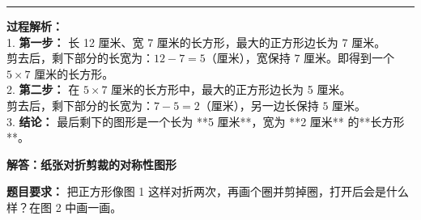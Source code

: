 \documentclass[12pt, a4paper]{ctexart}
\begin{document}
\vspace{1.0cm}
\hrule
\vspace{0.4cm}

{\small
\textbf{过程解析：} \\
1. \textbf{第一步：} 长 12 厘米、宽 7 厘米的长方形，最大的正方形边长为 7 厘米。 \\
   剪去后，剩下部分的长宽为：$12 - 7 = 5$（厘米），宽保持 $7$ 厘米。即得到一个 $5 \times 7$ 厘米的长方形。 \\
2. \textbf{第二步：} 在 $5 \times 7$ 厘米的长方形中，最大的正方形边长为 5 厘米。 \\
   剪去后，剩下部分的长宽为：$7 - 5 = 2$（厘米），另一边长保持 $5$ 厘米。 \\
3. \textbf{结论：} 最后剩下的图形是一个长为 **5 厘米**，宽为 **2 厘米** 的**长方形**。
}


\newpage

\begin{center}
  {\large\bfseries 解答：纸张对折剪裁的对称性图形}
\end{center}

\vspace{0.6cm}

\noindent
{\small \textbf{题目要求：} 把正方形像图 1 这样对折两次，再画个圈并剪掉圈，打开后会是什么样？在图 2 中画一画。}

\vspace{1.0cm}
\end{document}
